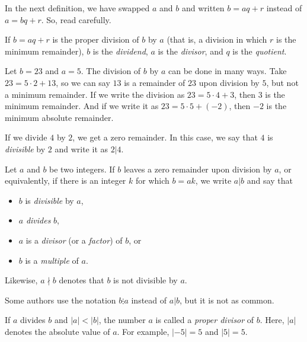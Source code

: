 \documentclass{subfile}
\begin{document}
In the next definition, we have swapped $a$ and $b$ and written $b=aq+r$ instead of $a=bq+r$. So, read carefully.

	\begin{definition}
		If $b=aq+r$ is the proper division of $b$ by $a$ (that is, a division in which $r$ is the minimum remainder), $b$ is the \textit{dividend}, $a$ is the \textit{divisor}, and $q$ is the \textit{quotient}.
	\end{definition}

	\begin{example}
		Let $b=23$ and $a=5$. The division of $b$ by $a$ can be done in many ways. Take $23=5\cdot2+13$, so we can say $13$ is a remainder of $23$ upon division by $5$, but not a minimum remainder. If we write the division as $23=5\cdot4+3$, then $3$ is the minimum remainder. And if we write it as $23=5\cdot5+(-2)$, then $-2$ is the minimum absolute remainder.
	\end{example}

	If we divide $4$ by $2$, we get a zero remainder. In this case, we say that $4$ is \textit{divisible} by $2$ and write it as $2|4$.

	\begin{definition}
		Let $a$ and $b$ be two integers. If $b$ leaves a zero remainder upon division by $a$, or equivalently, if there is an integer $k$ for which $b=ak$, we write $a|b$ and say that
		\begin{itemize}
			\item $b$ is \textit{divisible} by $a$,
			\item $a$ \textit{divides} $b$,
			\item $a$ is a \textit{divisor} (or a \textit{factor}) of $b$, or
			\item $b$ is a \textit{multiple} of $a$.
		\end{itemize}
		Likewise, $a\nmid b$ denotes that $b$ is not divisible by $a$.
	\end{definition}

	\begin{remark}
		Some authors use the notation $b\vdots a$ instead of $a|b$, but it is not as common.
	\end{remark}

	\begin{definition}
		If $a$ divides $b$ and $|a|<|b|$, the number $a$ is called a \textit{proper divisor} of $b$. Here, $|a|$ denotes the absolute value of $a$. For example, $|-5|=5$ and $|5|=5$.
	\end{definition}
\end{document}

